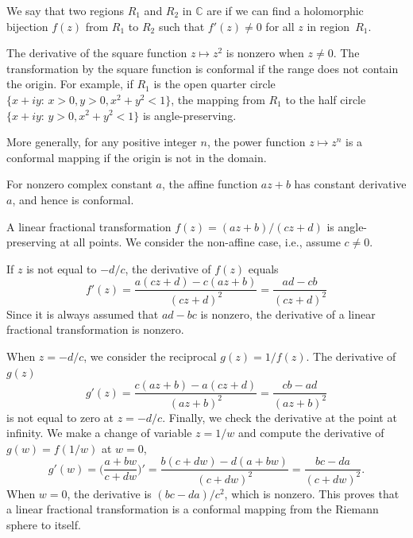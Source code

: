 \begin{svgraybox}
	\begin{definition} 
		We say that two regions $R_1$ and $R_2$ in $\mathbb{C}$ are  if we can find a holomorphic bijection $f(z)$ from $R_1$ to $R_2$ such that $f'(z)\neq 0$ for all $z$ in region~$R_1$.
	\end{definition}
\end{svgraybox}

\begin{example}
The derivative of the square function $z\mapsto z^2$ is nonzero when $z\neq 0$. The transformation by the square function is conformal if the range does not contain the origin. For example, if $R_1$ is the open quarter circle $\{x+iy:\, x> 0, y>0, x^2+y^2<1\}$, the mapping from $R_1$ to the half circle $\{x+iy:\, y>0, x^2+y^2<1\}$ is angle-preserving.
\end{example}


More generally, for any positive integer $n$, the power function $z\mapsto z^n$ is a conformal mapping if the origin is not in the domain.


\begin{example} For nonzero complex constant $a$, the 
affine function $az+b$ has constant derivative $a$, and hence is conformal.
\end{example}


\begin{example}
A linear fractional transformation $f(z) = (az+b)/(cz+d)$ is angle-preserving at all points. We consider the non-affine case, i.e., assume $c\neq 0$.

If $z$ is not equal to $-d/c$, the derivative of $f(z)$ equals
$$
f'(z) = \frac{a(cz+d) - c(az+b)}{(cz+d)^2} = 
\frac{ad- cb}{(cz+d)^2} 
$$
Since it is always assumed that $ad-bc$ is nonzero, the derivative of a linear fractional transformation is nonzero.

When $z=-d/c$, we consider the reciprocal $g(z) = 1/f(z)$. The derivative of $g(z)$ 
$$
g'(z)  = \frac{c(az+b) - a(cz+d)}{(az+b)^2} 
 = \frac{cb - ad}{(az+b)^2} 
$$
is not equal to zero at $z=-d/c$.
Finally, we check the derivative at the point at infinity. We make a change of variable $z=1/w$ and compute the derivative of $g(w) = f(1/w)$ at $w=0$,
$$
g'(w) = \big( \frac{a+bw}{c+dw} \big)' = 
\frac{b(c+dw) - d(a+bw)}{(c+dw)^2} =
\frac{bc - da}{(c+dw)^2} .
$$
When $w=0$, the derivative is $(bc-da)/c^2$, which is nonzero. This proves that a linear fractional transformation is a conformal mapping from the Riemann sphere to itself.
\end{example}


